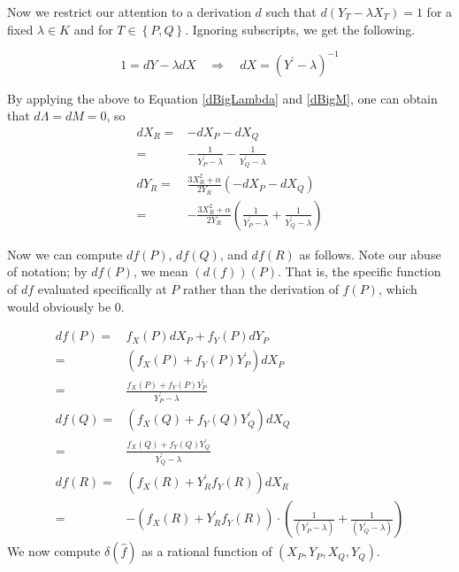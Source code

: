 \documentclass[11pt,letterpaper]{article}
\theoremstyle{definition}
\newcommand{\6}{\mathbf}
\newcommand{\7}{\mathcal}
\begin{document}
Now we restrict our attention to a derivation $d$ such that $d(Y_T -\lambda X_T) = 1$ for a fixed $\lambda \in K$ and for $T \in \left\{P, Q\right\}$. Ignoring subscripts, we get the following.

$$1 = dY - \lambda dX \quad \Rightarrow \quad dX = (Y^\prime - \lambda)^{-1}$$


By applying the above to Equation \ref{dBigLambda} and \ref{dBigM}, one can obtain that $d\Lambda = dM = 0$, so 
\begin{align}
dX_R =& -dX_P - dX_Q \nonumber\\
=& -\frac{1}{Y_P^\prime - \lambda} - \frac{1}{Y_Q^\prime - \lambda} \\
dY_R 
=& \frac{3X_R^2+\alpha}{2Y_R}\left(-dX_P - dX_Q\right) \nonumber \\
=& -\frac{3X_R^2+\alpha}{2Y_R}\left(\frac{1}{Y_P^\prime - \lambda} + \frac{1}{Y_Q^\prime - \lambda}\right)
\end{align}

Now we can compute $df(P)$, $df(Q)$, and $df(R)$ as follows. Note our abuse of notation; by $df(P)$, we mean $(d(f))(P)$. That is, the specific function of $df$ evaluated specifically at $P$ rather than the derivation of $f(P)$, which would obviously be 0.

\begin{align}
df(P) =& f_X(P) dX_P + f_Y(P) dY_P \nonumber \\
=& (f_X(P) + f_Y(P)Y_P^\prime)dX_P \nonumber \\
=& \frac{f_X(P) + f_Y(P)Y_P^\prime}{Y_P^\prime - \lambda}\label{dfp} \\
df(Q) =& (f_X(Q) + f_Y(Q)Y_Q^\prime)dX_Q \nonumber \\
=& \frac{f_X(Q) + f_Y(Q)Y_Q^\prime}{Y_Q^\prime - \lambda} \label{dfq} \\
df(R) 
=& (f_X(R) + Y^\prime_R f_Y(R))dX_R \nonumber \\
=& -(f_X(R) + Y^\prime_R f_Y(R))\cdot \left(\frac{1}{(Y_P^\prime - \lambda)} + \frac{1}{(Y_Q^\prime - \lambda)}\right) \label{dfr}
\end{align}
We now compute $\delta(\widehat{f})$ as a rational function of $(X_P, Y_P, X_Q, Y_Q)$. 
\end{document}
